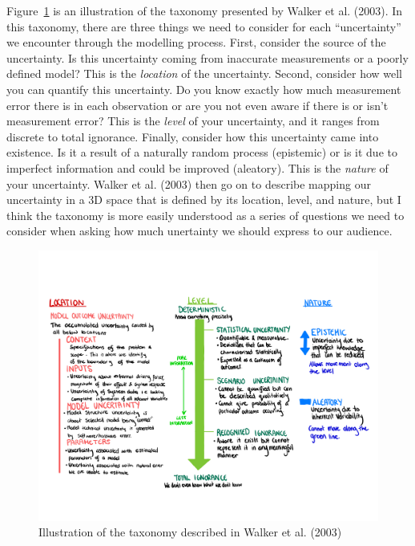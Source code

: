 \documentclass[
  letterpaper,
  DIV=11,
  numbers=noendperiod]{scrartcl}
\begin{document}
Figure~\ref{fig-taxonomy} is an illustration of the taxonomy presented
by Walker et al. (2003). In this taxonomy, there are three things we
need to consider for each ``uncertainty'' we encounter through the
modelling process. First, consider the source of the uncertainty. Is
this uncertainty coming from inaccurate measurements or a poorly defined
model? This is the \emph{location} of the uncertainty. Second, consider
how well you can quantify this uncertainty. Do you know exactly how much
measurement error there is in each observation or are you not even aware
if there is or isn't measurement error? This is the \emph{level} of your
uncertainty, and it ranges from discrete to total ignorance. Finally,
consider how this uncertainty came into existence. Is it a result of a
naturally random process (epistemic) or is it due to imperfect
information and could be improved (aleatory). This is the \emph{nature}
of your uncertainty. Walker et al. (2003) then go on to describe mapping
our uncertainty in a 3D space that is defined by its location, level,
and nature, but I think the taxonomy is more easily understood as a
series of questions we need to consider when asking how much unertainty
we should express to our audience.

\begin{figure}

{\centering \includegraphics{taxonomyvis.jpeg}

}

\caption{\label{fig-taxonomy}Illustration of the taxonomy described in
Walker et al. (2003)}

\end{figure}
\end{document}
